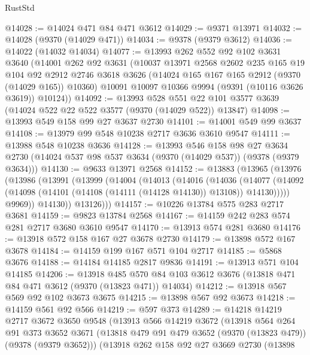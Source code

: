 \begin{lexlean}{RustStd}
\begin{coremodule}
@14028 := @14024 @471 @84 @471 @3612
@14029 := @9371 @13971
@14032 := @14028 (@9370 (@14029 @471))
@14034 := @9378 (@9379 @3612)
@14036 := @14022 (@14032 @14034)
@14077 := @13993
    @262
    @552
    @92
    @102
    @3631
    @3640
    (@14001
      @262
      @92
      @3631
      (@10037
        @13971
        @2568
        @2602
        @235
        @165
        @19
        @104
        @92
        @2912
        @2746
        @3618
        @3626
        (@14024 @165 @167 @165 @2912 (@9370 (@14029 @165)) @10360)
        @10091
        @10097
        @10366
        @9994
        (@9391 (@10116 @3626 @3619))
        @10124))
@14092 := @13993
    @528
    @551
    @22
    @101
    @3577
    @3639
    (@14024 @522 @22 @522 @3577 (@9370 (@14029 @522)) @13847)
@14098 := @13993 @549 @158 @99 @27 @3637 @2730
@14101 := @14001 @549 @99 @3637
@14108 := @13979 @99 @548 @10238 @2717 @3636 @3610 @9547
@14111 := @13988 @548 @10238 @3636
@14128 := @13993
    @546
    @158
    @98
    @27
    @3634
    @2730
    (@14024 @537 @98 @537 @3634 (@9370 (@14029 @537)) (@9378 (@9379 @3634)))
@14130 := @9633 @13971 @2568
@14152 := @13883
    (@13965
      (@13976
        (@13986
          (@13991
            (@13999
              (@14004
                (@14013
                  (@14016
                    (@14036
                      (@14077
                        (@14092
                          (@14098 (@14101 (@14108 (@14111 (@14128 @14130)) @13108)) @14130)))))
                  @9969))
              @14130))
          @13126)))
@14157 := @10226 @13784 @575 @283 @2717 @3681
@14159 := @9823 @13784 @2568
@14167 := @14159 @242 @283 @574 @281 @2717 @3680 @3610 @9547
@14170 := @13913 @574 @281 @3680
@14176 := @13918 @572 @158 @167 @27 @3678 @2730
@14179 := @13898 @572 @167 @3678
@14184 := @14159 @199 @167 @571 @104 @2717
@14185 := @5868 @3676
@14188 := @14184 @14185 @2817 @9836
@14191 := @13913 @571 @104 @14185
@14206 := @13918
    @485
    @570
    @84
    @103
    @3612
    @3676
    (@13818 @471 @84 @471 @3612 (@9370 (@13823 @471)) @14034)
@14212 := @13918 @567 @569 @92 @102 @3673 @3675
@14215 := @13898 @567 @92 @3673
@14218 := @14159 @561 @92 @566
@14219 := @597 @373
@14289 := @14218
    @14219
    @2717
    @3672
    @3650
    @9548
    (@13913
      @566
      @14219
      @3672
      (@13918
        @564
        @264
        @91
        @373
        @3652
        @3671
        (@13818 @479 @91 @479 @3652 (@9370 (@13823 @479)) (@9378 (@9379 @3652)))
        (@13918
          @262
          @158
          @92
          @27
          @3669
          @2730
          (@13898

\end{coremodule}
\end{lexlean}
